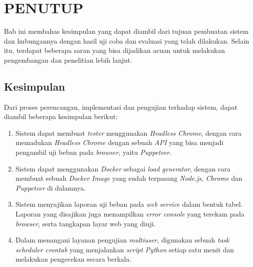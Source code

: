 \chapter{PENUTUP}
    Bab ini membahas kesimpulan yang dapat diambil dari tujuan pembuatan sistem dan hubungannya dengan hasil uji coba dan evaluasi yang telah dilakukan. Selain itu, terdapat beberapa saran yang bisa dijadikan acuan untuk melakukan pengembangan dan penelitian lebih lanjut.
        
	\section{Kesimpulan}
        Dari proses perencangan, implementasi dan pengujian terhadap sistem, dapat diambil beberapa kesimpulan berikut:
        \begin{enumerate}
        	\item Sistem dapat membuat \textit{tester} menggunakan \textit{Headless Chrome}, dengan cara memadukan \textit{Headless Chrome} dengan sebuah \textit{API} yang bisa menjadi pengambil uji beban pada \textit{browser}, yaitu \textit{Puppeteer}.
        	\item Sistem dapat menggunakan \textit{Docker} sebagai \textit{load generator}, dengan cara membuat sebuah \textit{Docker Image} yang sudah terpasang \textit{Node.js}, \textit{Chrome} dan \textit{Puppeteer} di dalamnya.
        	\item Sistem menyajikan laporan uji beban pada \textit{web service} dalam bentuk tabel. Laporan yang disajikan juga menampilkan \textit{error console} yang terekam pada \textit{browser}, serta tangkapan layar web yang diuji.
        	\item Dalam menangani layanan pengujian \textit{multiuser}, digunakan sebuah \textit{task scheduler crontab} yang menjalankan \textit{script Python} setiap satu menit dan melakukan pengecekan secara berkala.
        \end{enumerate}
        
